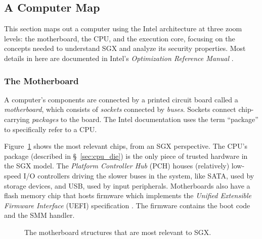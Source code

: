 \subsection{A Computer Map}

This section maps out a computer using the Intel architecture at three zoom
levels: the motherboard, the CPU, and the execution core, focusing on the
concepts needed to understand SGX and analyze its security properties. Most
details in here are documented in Intel's
\textit{Optimization Reference Manual} \cite{intel2014optimization}.


\subsubsection{The Motherboard}
\label{sec:motherboard}

A computer's components are connected by a printed circuit board called a
\textit{motherboard}, which consists of \textit{sockets} connected by
\textit{buses}. Sockets connect chip-carrying \textit{packages} to the board.
The Intel documentation uses the term ``package'' to specifically refer to a
CPU.

Figure~\ref{fig:motherboard} shows the most relevant chips, from an SGX
perspective. The CPU's package (described in \S~\ref{sec:cpu_die}) is the only
piece of trusted hardware in the SGX model. The \textit{Platform Controller
Hub} (PCH) houses (relatively) low-speed I/O controllers driving the slower
buses in the system, like SATA, used by storage devices, and USB, used by
input peripherals.  Motherboards also have a flash memory chip that hosts
firmware which implements the \textit{Unified Extensible Firmware Interface}
(UEFI) specification \cite{forum2015uefi}. The firmware contains the boot code
and the SMM handler.

\begin{figure}[hbt]
  \caption{
    The motherboard structures that are most relevant to SGX.
  }
  \label{fig:motherboard}
\end{figure}

